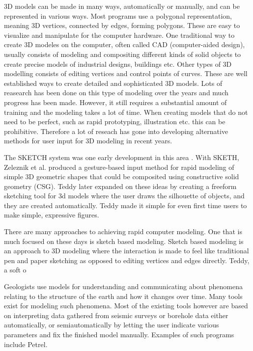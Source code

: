 \documentclass[a4paper,12pt]{report}
\begin{document}
3D models can be made in many ways, automatically or manually, and can be represented in various ways. Most programs use a polygonal representation, meaning 3D vertices, connected by edges, forming polygons. These are easy to visualize and manipulate for the computer hardware. One traditional way to create 3D modeles on the computer, often called CAD (computer-aided design),	 usually consists of modeling and compositing different kinds of solid objects to create precise models of industrial designs, buildings etc. Other types of 3D modelling consists of editing vertices and control points of curves. These are well established ways to create detailed and sophisticated 3D models. Lots of reasearch has been done on this type of modeling over the years and much progress has been made. However, it still requires a substantial amount of training and the modeling takes a lot of time. When creating models that do not need to be perfect, such as rapid prototyping, illustration etc. this can be prohibitive. Therefore a lot of reseach has gone into developing alternative methods for user input for 3D modeling in recent years.

The SKETCH system was one early development in this area \cite{zeleznik2007sketch}. With SKETH, Zeleznik et al. produced a gesture-based input method for rapid modeling of simple 3D geometric shapes that could be composited using constructive solid geometry (CSG). Teddy \cite{Igarashi:1999:TSI:311535.311602} later expanded on these ideas by creating a freeform sketching tool for 3d models where the user draws the silhouette of objects, and they are created automatically. Teddy made it simple for even first time users to make simple, expressive figures.

There are many approaches to achieving rapid computer modeling. One that is much focused on these days is sketch based modeling. Sketch based modeling is an approach to 3D modeling where the interaction is made to feel like traditional pen and paper sketching as opposed to editing vertices and edges directly. Teddy, a soft o

Geologists use models for understanding and communicating about phenomena relating to the structure of the earth and how it changes over time. Many tools exist for modeling such phenomena. Most of the existing tools however are based on interpreting data gathered from seismic surveys or borehole data either automatically, or semiautomatically by letting the user indicate various parameters and fix the finished model manually. Examples of such programs include Petrel.
\end{document}
